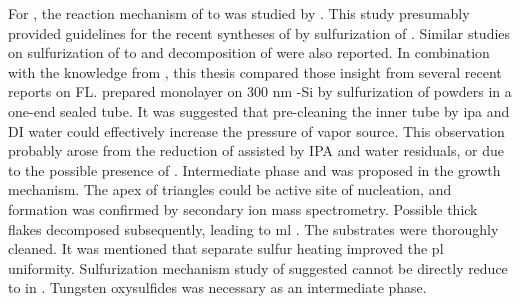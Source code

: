 For , the reaction mechanism of  to  was studied by \citeauthor{Weber1996}.\cite{Weber1996} This study presumably provided guidelines for the recent syntheses of  by sulfurization of .\cite{Lin2012,Lee2012b,Liu2012a,Najmaei2013} Similar studies on sulfurization of  to  and decomposition of  were also reported.\cite{VanderVlies2002,VanderVlies2002a} In combination with the knowledge from , this thesis compared those insight from several recent reports on  FL. \citeauthor{Cong2013} prepared monolayer  on 300 nm -Si by sulfurization of  powders in a one-end sealed tube.\cite{Cong2013} It was suggested that pre-cleaning the inner tube by \gls{ipa} and DI water could effectively increase the pressure of vapor source. This observation probably arose from the reduction of  assisted by IPA and water residuals, or due to the possible presence of . Intermediate phase  and  was proposed in the growth mechanism. The apex of triangles could be active site of nucleation, and  formation was confirmed by secondary ion mass spectrometry. Possible thick  flakes decomposed subsequently, leading to \gls{ml} . The substrates were thoroughly cleaned. It was mentioned that separate sulfur heating improved the \gls{pl} uniformity. Sulfurization mechanism study of  suggested  cannot be directly reduce to  in .\cite{VanderVlies2002,VanderVlies2002a} Tungsten oxysulfides was necessary as an intermediate phase. 

